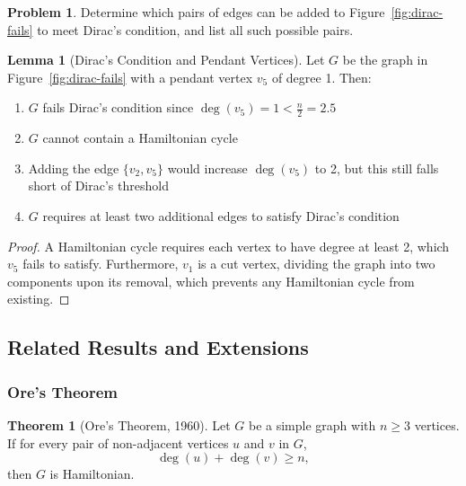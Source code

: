 \documentclass{article}
\theoremstyle{definition}
\newtheorem{problem}{Problem}
\newtheorem{theorem}{Theorem}
\newtheorem{lemma}{Lemma}
\begin{document}
\begin{problem}
Determine which pairs of edges can be added to Figure~\ref{fig:dirac-fails} to meet Dirac's condition, and list all such possible pairs.
\end{problem}
\begin{lemma}[Dirac's Condition and Pendant Vertices]
Let $G$ be the graph in Figure~\ref{fig:dirac-fails} with a pendant vertex $v_5$ of degree 1. Then:
\begin{enumerate}
    \item $G$ fails Dirac's condition since $\deg(v_5) = 1 < \frac{n}{2} = 2.5$
    \item $G$ cannot contain a Hamiltonian cycle
    \item Adding the edge $\{v_2, v_5\}$ would increase $\deg(v_5)$ to 2, but this still falls short of Dirac's threshold
    \item $G$ requires at least two additional edges to satisfy Dirac's condition
\end{enumerate}
\end{lemma}

\begin{proof}
A Hamiltonian cycle requires each vertex to have degree at least 2, which $v_5$ fails to satisfy. Furthermore, $v_1$ is a cut vertex, dividing the graph into two components upon its removal, which prevents any Hamiltonian cycle from existing.
\end{proof}
\newpage
\subsection{Related Results and Extensions}
\subsubsection{Ore's Theorem}

\begin{theorem}[Ore's Theorem, 1960]
Let $G$ be a simple graph with $n \geq 3$ vertices. If for every pair of non-adjacent vertices $u$ and $v$ in $G$, 
\[\deg(u) + \deg(v) \geq n,\]
then $G$ is Hamiltonian.
\end{theorem}
\end{document}
